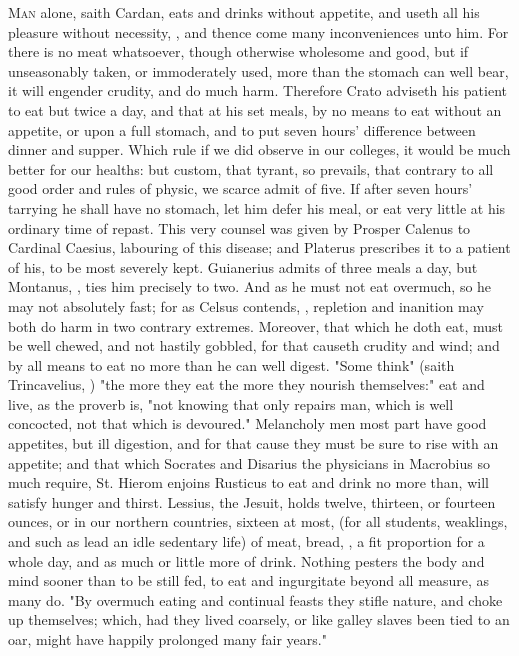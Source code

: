 {\lettrine{M}{an} alone, saith Cardan, eats and drinks without appetite, and useth all his pleasure without necessity, , and thence come many inconveniences unto him. For there is no meat whatsoever, though otherwise wholesome and good, but if unseasonably taken, or immoderately used, more than the stomach can well bear, it will engender crudity, and do much harm. Therefore Crato adviseth his patient to eat but twice a day, and that at his set meals, by no means to eat without an appetite, or upon a full stomach, and to put seven hours' difference between dinner and supper. Which rule if we did observe in our colleges, it would be much better for our healths: but custom, that tyrant, so prevails, that contrary to all good order and rules of physic, we scarce admit of five. If after seven hours' tarrying he shall have no stomach, let him defer his meal, or eat very little at his ordinary time of repast. This very counsel was given by Prosper Calenus to Cardinal Caesius, labouring of this disease; and Platerus prescribes it to a patient of his, to be most severely kept. Guianerius admits of three meals a day, but Montanus, , ties him precisely to two. And as he must not eat overmuch, so he may not absolutely fast; for as Celsus contends, , repletion and inanition may both do harm in two contrary extremes. Moreover, that which he doth eat, must be well chewed, and not hastily gobbled, for that causeth crudity and wind; and by all means to eat no more than he can well digest. "Some think" (saith Trincavelius, ) "the more they eat the more they nourish themselves:" eat and live, as the proverb is, "not knowing that only repairs man, which is well concocted, not that which is devoured." Melancholy men most part have good appetites, but ill digestion, and for that cause they must be sure to rise with an appetite; and that which Socrates and Disarius the physicians in Macrobius so much require, St. Hierom enjoins Rusticus to eat and drink no more than, will satisfy hunger and thirst. Lessius, the Jesuit, holds twelve, thirteen, or fourteen ounces, or in our northern countries, sixteen at most, (for all students, weaklings, and such as lead an idle sedentary life) of meat, bread, \etc{}, a fit proportion for a whole day, and as much or little more of drink. Nothing pesters the body and mind sooner than to be still fed, to eat and ingurgitate beyond all measure, as many do. "By overmuch eating and continual feasts they stifle nature, and choke up themselves; which, had they lived coarsely, or like galley slaves been tied to an oar, might have happily prolonged many fair years."

}
